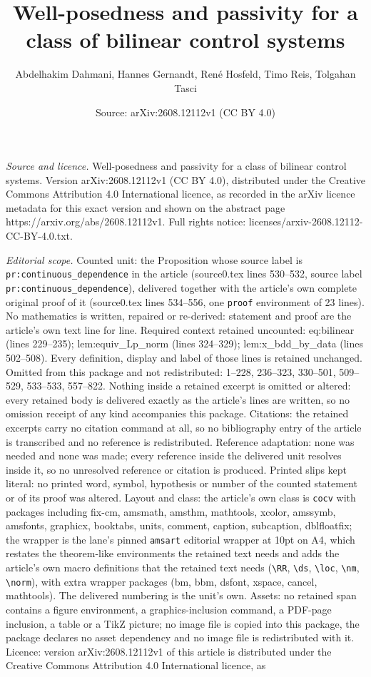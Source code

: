 \documentclass[10pt,a4paper]{amsart}
\title[Well-posedness and passivity for a class of bilinear control]{Well-posedness and passivity for a class of bilinear control systems}
\author{Abdelhakim Dahmani, Hannes Gernandt, Ren\'e Hosfeld, Timo Reis, Tolgahan Tasci}
\date{Source: arXiv:2608.12112v1 (CC BY 4.0)}
\begin{document}
\maketitle

\noindent\emph{Source and licence.} Well-posedness and passivity for a class of bilinear control systems. Version arXiv:2608.12112v1 (CC BY 4.0), distributed under the Creative Commons Attribution 4.0 International licence, as recorded in the arXiv licence metadata for this exact version and shown on the abstract page https://arxiv.org/abs/2608.12112v1. Full rights notice: licenses/arxiv-2608.12112-CC-BY-4.0.txt.\par\smallskip

\noindent\textit{Editorial scope.} Counted unit: the Proposition whose source label is \texttt{pr:continuous\_dependence} in the article (source0.tex lines 530--532, source label \texttt{pr:continuous\_dependence}), delivered together with the article's own complete original proof of it (source0.tex lines 534--556, one \texttt{proof} environment of 23 lines). No mathematics is written, repaired or re-derived: statement and proof are the article's own text line for line. Required context retained uncounted: eq:bilinear (lines 229--235); lem:equiv\_Lp\_norm (lines 324--329); lem:x\_bdd\_by\_data (lines 502--508). Every definition, display and label of those lines is retained unchanged. Omitted from this package and not redistributed: 1--228, 236--323, 330--501, 509--529, 533--533, 557--822. Nothing inside a retained excerpt is omitted or altered: every retained body is delivered exactly as the article's lines are written, so no omission receipt of any kind accompanies this package. Citations: the retained excerpts carry no citation command at all, so no bibliography entry of the article is transcribed and no reference is redistributed. Reference adaptation: none was needed and none was made; every reference inside the delivered unit resolves inside it, so no unresolved reference or citation is produced. Printed slips kept literal: no printed word, symbol, hypothesis or number of the counted statement or of its proof was altered. Layout and class: the article's own class is \texttt{cocv} with packages including fix-cm, amsmath, amsthm, mathtools, xcolor, amssymb, amsfonts, graphicx, booktabs, units, comment, caption, subcaption, dblfloatfix; the wrapper is the lane's pinned \texttt{amsart} editorial wrapper at 10pt on A4, which restates the theorem-like environments the retained text needs and adds the article's own macro definitions that the retained text needs (\texttt{\textbackslash RR}, \texttt{\textbackslash ds}, \texttt{\textbackslash loc}, \texttt{\textbackslash nm}, \texttt{\textbackslash norm}), with extra wrapper packages (bm, bbm, dsfont, xspace, cancel, mathtools). The delivered numbering is the unit's own. Assets: no retained span contains a figure environment, a graphics-inclusion command, a PDF-page inclusion, a table or a TikZ picture; no image file is copied into this package, the package declares no asset dependency and no image file is redistributed with it. Licence: version arXiv:2608.12112v1 of this article is distributed under the Creative Commons Attribution 4.0 International licence, as 
\end{document}
